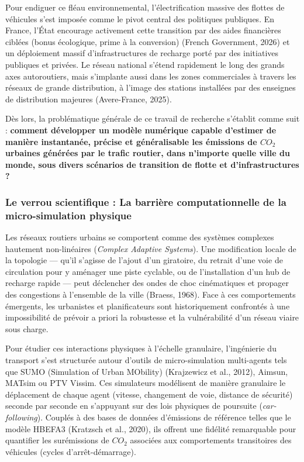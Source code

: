 \documentclass[10pt, a4paper]{article}
\begin{document}
Pour endiguer ce fléau environnemental, l'électrification massive des
flottes de véhicules s'est imposée comme le pivot central des politiques
publiques. En France, l'État encourage activement cette transition par
des aides financières ciblées (bonus écologique, prime à la conversion)
(French Government, 2026) et un déploiement massif d'infrastructures de
recharge porté par des initiatives publiques et privées. Le réseau
national s'étend rapidement le long des grands axes autoroutiers, mais
s'implante aussi dans les zones commerciales à travers les réseaux de
grande distribution, à l'image des stations installées par des enseignes
de distribution majeures (Avere-France, 2025).

Dès lors, la problématique générale de ce travail de recherche s'établit
comme suit : \textbf{comment développer un modèle numérique capable
d'estimer de manière instantanée, précise et généralisable les émissions
de \(CO_2\) urbaines générées par le trafic routier, dans n'importe
quelle ville du monde, sous divers scénarios de transition de flotte et
d'infrastructures ?}

\subsubsection{Le verrou scientifique : La barrière computationnelle de
la micro-simulation
physique}\label{le-verrou-scientifique-la-barriuxe8re-computationnelle-de-la-micro-simulation-physique}

Les réseaux routiers urbains se comportent comme des systèmes complexes
hautement non-linéaires (\emph{Complex Adaptive Systems}). Une
modification locale de la topologie --- qu'il s'agisse de l'ajout d'un
giratoire, du retrait d'une voie de circulation pour y aménager une
piste cyclable, ou de l'installation d'un hub de recharge rapide ---
peut déclencher des ondes de choc cinématiques et propager des
congestions à l'ensemble de la ville (Braess, 1968). Face à ces
comportements émergents, les urbanistes et planificateurs sont
historiquement confrontés à une impossibilité de prévoir a priori la
robustesse et la vulnérabilité d'un réseau viaire sous charge.

Pour étudier ces interactions physiques à l'échelle granulaire,
l'ingénierie du transport s'est structurée autour d'outils de
micro-simulation multi-agents tels que SUMO (Simulation of Urban
MObility) (Krajzewicz et al., 2012), Aimsun, MATsim ou PTV Vissim. Ces
simulateurs modélisent de manière granulaire le déplacement de chaque
agent (vitesse, changement de voie, distance de sécurité) seconde par
seconde en s'appuyant sur des lois physiques de poursuite
(\emph{car-following}). Couplés à des bases de données d'émissions de
référence telles que le modèle HBEFA3 (Kratzsch et al., 2020), ils
offrent une fidélité remarquable pour quantifier les surémissions de
\(CO_2\) associées aux comportements transitoires des véhicules (cycles
d'arrêt-démarrage).
\end{document}
